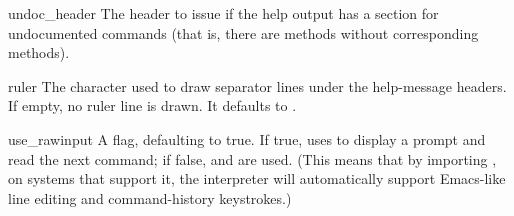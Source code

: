\begin{memberdesc}{undoc_header}
The header to issue if the help output has a section for undocumented 
commands (that is, there are  methods without
corresponding  methods).
\end{memberdesc}

\begin{memberdesc}{ruler}
The character used to draw separator lines under the help-message
headers.  If empty, no ruler line is drawn.  It defaults to
\character{=}.
\end{memberdesc}

\begin{memberdesc}{use_rawinput}
A flag, defaulting to true.  If true,  uses
 to display a prompt and read the next command;
if false,  and
 are used. (This means that by
importing , on systems that support it, the
interpreter will automatically support Emacs-like line editing 
and command-history keystrokes.)
\end{memberdesc}
